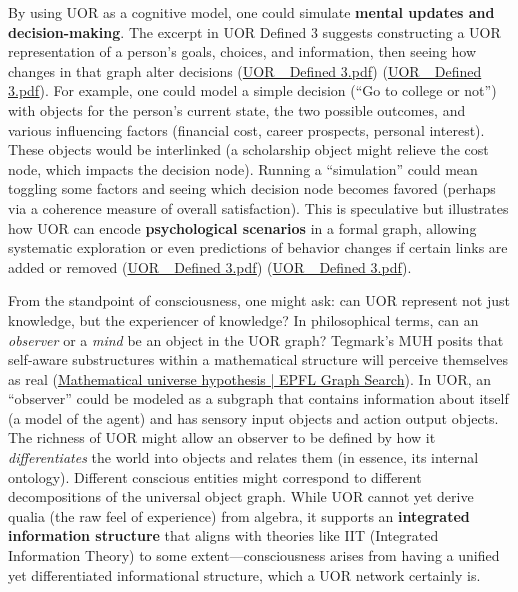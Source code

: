 \documentclass[12pt]{article}
\begin{document}
\medskip

By using UOR as a cognitive model, one could simulate \textbf{mental updates and decision-making}. The excerpt in UOR Defined 3 suggests constructing a UOR representation of a person’s goals, choices, and information, then seeing how changes in that graph alter decisions (\href{file://file-3oEyMHjK5WgHWfYmLyzhts#:~:text=semantic%20memory%20,making%20frameworks%20in%20psychology%3A%20one}{UOR\_ Defined 3.pdf}) (\href{file://file-3oEyMHjK5WgHWfYmLyzhts#:~:text=that%20graph,making%20frameworks%20in%20psychology%3A%20one}{UOR\_ Defined 3.pdf}). For example, one could model a simple decision (``Go to college or not'') with objects for the person’s current state, the two possible outcomes, and various influencing factors (financial cost, career prospects, personal interest). These objects would be interlinked (a scholarship object might relieve the cost node, which impacts the decision node). Running a ``simulation'' could mean toggling some factors and seeing which decision node becomes favored (perhaps via a coherence measure of overall satisfaction). This is speculative but illustrates how UOR can encode \textbf{psychological scenarios} in a formal graph, allowing systematic exploration or even predictions of behavior changes if certain links are added or removed (\href{file://file-3oEyMHjK5WgHWfYmLyzhts#:~:text=that%20graph,making%20frameworks%20in%20psychology%3A%20one}{UOR\_ Defined 3.pdf}) (\href{file://file-3oEyMHjK5WgHWfYmLyzhts#:~:text=could%20model%20a%20person%E2%80%99s%20goals%2C,like%20object%20networks}{UOR\_ Defined 3.pdf}).

\medskip

From the standpoint of consciousness, one might ask: can UOR represent not just knowledge, but the experiencer of knowledge? In philosophical terms, can an \emph{observer} or a \emph{mind} be an object in the UOR graph? Tegmark’s MUH posits that self-aware substructures within a mathematical structure will perceive themselves as real (\href{https://graphsearch.epfl.ch/concept/2148329#:~:text=specifically%2C%20a%20mathematical%20structure,form%20of%20mathematicism%20in%20that}{Mathematical universe hypothesis | EPFL Graph Search}). In UOR, an “observer” could be modeled as a subgraph that contains information about itself (a model of the agent) and has sensory input objects and action output objects. The richness of UOR might allow an observer to be defined by how it \emph{differentiates} the world into objects and relates them (in essence, its internal ontology). Different conscious entities might correspond to different decompositions of the universal object graph. While UOR cannot yet derive qualia (the raw feel of experience) from algebra, it supports an \textbf{integrated information structure} that aligns with theories like IIT (Integrated Information Theory) to some extent---consciousness arises from having a unified yet differentiated informational structure, which a UOR network certainly is.
\end{document}
